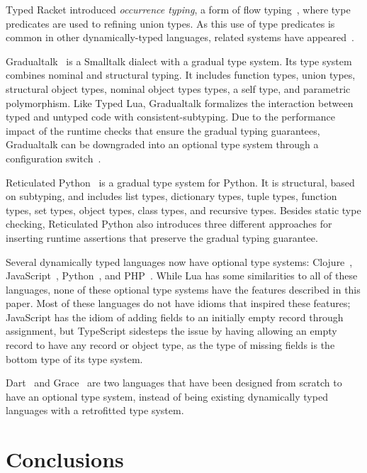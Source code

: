 \documentclass[preprint]{sigplanconf}
\begin{document}
Typed Racket introduced {\em occurrence typing}, a form of
flow typing~\cite{tobin-hochstadt2010ltu}, where type
predicates are used to refining union types.
As this use of type predicates is common in other
dynamically-typed languages, related systems
have appeared~\cite{guha2011tlc,winther2011gtp,pearce2013ccf}.

Gradualtalk~\cite{allende2013gts} is a Smalltalk dialect 
with a gradual type system. Its type system combines
nominal and structural typing.
It includes function types, union types, structural object types,
nominal object types types, a self type, and parametric polymorphism. Like Typed Lua, Gradualtalk formalizes the
interaction between typed and untyped code with consistent-subtyping. Due to the performance impact of
the runtime checks that ensure the gradual typing guarantees,
Gradualtalk can be downgraded into an optional type system
through a configuration switch~\cite{allende2013cis}.

Reticulated Python~\cite{vitousek2014deg} is a
gradual type system for Python. It is structural, based on subtyping, and includes list types,
dictionary types, tuple types, function types, set types,
object types, class types, and recursive types.
Besides static type checking, Reticulated Python also introduces
three different approaches for inserting runtime assertions
that preserve the gradual typing guarantee.

Several dynamically typed languages now have optional
type systems: Clojure~\cite{bonnaire-sergeant2015typed-clojure},
JavaScript~\cite{typescript}, Python~\cite{mypy}, 
and PHP~\cite{hack}. While Lua has some similarities to
all of these languages, none of these optional type
systems have the features described in this paper.
Most of these languages do not have idioms
that inspired these features; JavaScript has the
idiom of adding fields to an initially empty
record through assignment, but TypeScript sidesteps
the issue by having allowing an empty record to
have any record or object type, as the type of
missing fields is the bottom type of its type system.

Dart~\cite{dart} and Grace~\cite{black2013sg} are
two languages that have been designed from scratch
to have an optional type system, instead of being
existing dynamically typed languages with a retrofitted 
type system. 

\section{Conclusions}
\label{sec:conclusion}
\end{document}
